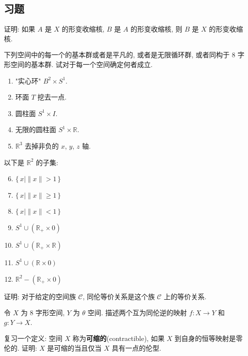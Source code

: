 \subsection*{习题}

\begin{exercise}
证明: 如果 $A$ 是 $X$ 的形变收缩核, $B$ 是 $A$ 的形变收缩核, 则 $B$ 是 $X$ 的形变收缩核.
\end{exercise}

\begin{exercise}
下列空间中的每一个的基本群或者是平凡的, 或者是无限循环群, 或者同构于 8 字形空间的基本群. 试对于每一个空间确定何者成立.
\begin{enumerate}
\item "实心环" $B^{2}\times S^{1}$.
\item 环面 $T$ 挖去一点.
\item 圆柱面 $S^{1}\times I$.
\item 无限的圆柱面 $S^{1}\times\mathbb{R}$.
\item $\mathbb{R}^{3}$ 去掉非负的 $x$, $y$, $z$ 轴.
\end{enumerate}
以下是 $\mathbb{R}^{2}$ 的子集:
\begin{enumerate}
\setcounter{enumi}{5}
\item $\{\,x\mid\|x\|>1\,\}$
\item $\{\,x\mid\|x\|\geqslant 1\,\}$
\item $\{\,x\mid\|x\|<1\,\}$
\item $S^{1}\cup(\mathbb{R}_{+}\times 0)$
\item $S^{1}\cup(\mathbb{R}_{+}\times\mathbb{R})$
\item $S^{1}\cup(\mathbb{R}\times 0)$
\item $\mathbb{R}^{2}-(\mathbb{R}_{+}\times 0)$
\end{enumerate}
\end{exercise}

\begin{exercise}
证明: 对于给定的空间族 $\mathcal{C}$, 同伦等价关系是这个族 $\mathcal{C}$ 上的等价关系.
\end{exercise}

\begin{exercise}
令 $X$ 为 8 字形空间, $Y$ 为 $\theta$ 空间. 描述两个互为同伦逆的映射 $f\colon X\to Y$ 和 $g\colon Y\to X$.
\end{exercise}

\begin{exercise}
复习一个定义: 空间 $X$ 称为\textbf{可缩的}(contractible), 如果 $X$ 到自身的恒等映射是零伦的. 证明: $X$ 是可缩的当且仅当 $X$ 具有一点的伦型.
\end{exercise}

